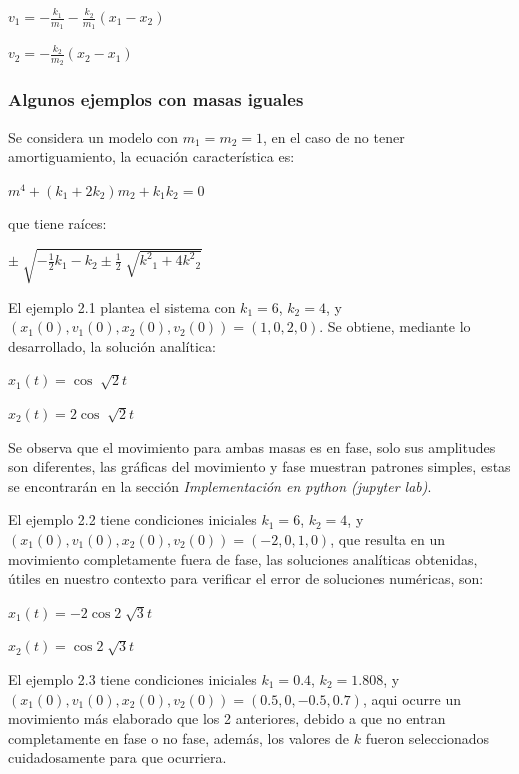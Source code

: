 \documentclass[a4paper]{article}
\begin{document}
\begin{center}
$v_1 = -\frac{k_1}{m_1} - \frac{k_2}{m_1} (x_1 - x_2)$

$v_2 = -\frac{k_2}{m_2} (x_2 - x_1)$
\end{center}

\subsubsection{Algunos ejemplos con masas iguales}

Se considera un modelo con $m_1 = m_2 = 1$, en el caso de no tener amortiguamiento, la ecuación característica es:

\begin{center}
$m^4 + (k_1 + 2 k_2) m_2 + k_1 k_2 = 0$
\end{center}

que tiene raíces: 

\begin{center}
$\pm \sqrt[]{-\frac{1}{2} k_1 - k_2 \pm \frac{1}{2} \sqrt[]{{k^2}_1 +4 {k^2}_2}}$
\end{center}


El ejemplo 2.1 plantea el sistema con $k_1 = 6$, $k_2 = 4$, y $(x_1(0),v_1(0),x_2(0),v_2(0)) = (1,0,2,0)$. Se obtiene, mediante lo desarrollado, la solución analítica:

\begin{center}
$x_1(t) = \cos \sqrt[]{2} t$

$x_2(t) = 2 \cos \sqrt[]{2} t$
\end{center}

Se observa que el movimiento para ambas masas es en fase, solo sus amplitudes son diferentes, las gráficas del movimiento y fase muestran patrones simples, estas se encontrarán en la sección \textit{Implementación en python (jupyter lab)}.

El ejemplo 2.2 tiene condiciones iniciales $k_1 = 6$, $k_2 = 4$, y $(x_1(0),v_1(0),x_2(0),v_2(0)) = (-2,0,1,0)$, que resulta en un movimiento completamente fuera de fase, las soluciones analíticas obtenidas, útiles en nuestro contexto para verificar el error de soluciones numéricas, son:

\begin{center}
$x_1(t) = -2 \cos 2 \sqrt[]{3} t$

$x_2(t) = \cos 2 \sqrt[]{3} t$
\end{center}

El ejemplo 2.3 tiene condiciones iniciales $k_1 = 0.4$, $k_2 = 1.808$, y $(x_1(0),v_1(0),x_2(0),v_2(0)) = (0.5,0,-0.5,0.7)$, aqui ocurre un movimiento más elaborado que los 2 anteriores, debido a que no entran completamente en fase o no fase, además, los valores de $k$ fueron seleccionados cuidadosamente para que ocurriera.
\end{document}
